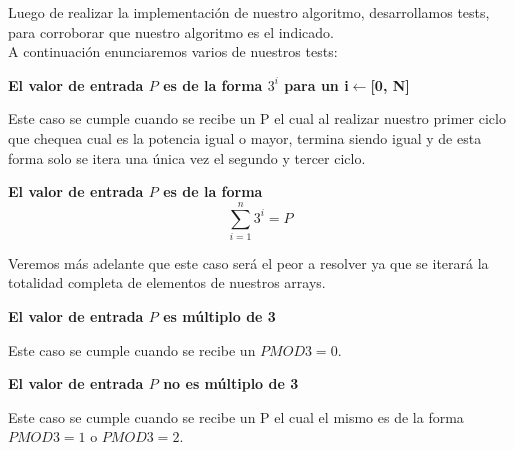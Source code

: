 \indent Luego de realizar la implementaci\'on de nuestro algoritmo, desarrollamos tests,
para corroborar que nuestro algoritmo es el indicado.\\

A continuaci\'on enunciaremos varios de nuestros tests:\\

\begin{center}
 \textbf{El valor de entrada $P$ es de la forma ${3^i}$ para un i$\gets$[0, N] }
\end{center}
 Este caso se cumple cuando se recibe un P el cual al realizar nuestro primer ciclo que chequea cual es la potencia igual o mayor, termina siendo igual y de esta forma solo se itera una \'unica vez el segundo y tercer ciclo.
 
\begin{center}
 \textbf{El valor de entrada $P$ es de la forma \[
\sum_{i=1}^{n}3^{i}=P 
\]}
\end{center}

Veremos m\'as adelante que este caso ser\'a el peor a resolver ya que se iterar\'a la totalidad completa de elementos de nuestros arrays.

\begin{center}
 \textbf{El valor de entrada $P$ es m\'ultiplo de 3}
\end{center}

 Este caso se cumple cuando se recibe un $P MOD 3 = 0$.

\begin{center}
 \textbf{El valor de entrada $P$ no es m\'ultiplo de 3}
\end{center}

 Este caso se cumple cuando se recibe un P el cual el mismo es de la forma $P MOD 3 = 1$ o $P MOD 3 = 2$.
 